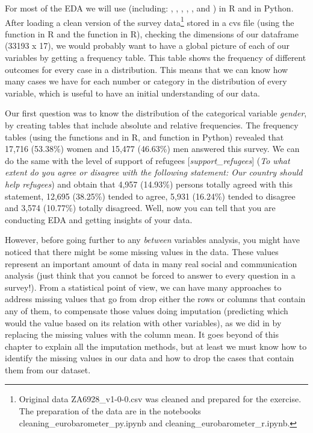 For most of the EDA we will use  (including: , , , , ,  and ) in R and  in Python. After loading a clean version of the survey data\footnote{Original data ZA6928\_v1-0-0.csv was cleaned and prepared for the exercise. The preparation of the data are in the notebooks cleaning\_eurobarometer\_py.ipynb and cleaning\_eurobarometer\_r.ipynb.}  stored in a cvs file (using the  function  in R and the  function  in R), checking the dimensions of our dataframe (33193 x 17), we would probably want to have a global picture of each of our variables by getting a frequency table. This table shows the frequency of different outcomes for every case in a distribution. This means that we can know how many cases we have for each number or category in the distribution of every variable, which is useful to have an initial understanding of our data.

		
Our first question was to know the distribution of the categorical variable \textit{gender}, by creating tables that include absolute and relative frequencies. The frequency tables (using the  functions  and  in R, and  function  in Python) revealed that 17,716 (53.38\%) women and 15,477 (46.63\%) men answered this survey. We can do the same with the level of support of refugees [\textit{support\_refugees}] (\textit{To what extent do you agree or disagree with the following statement: Our country should help refugees}) and obtain that 4,957 (14.93\%) persons totally agreed with this statement, 12,695 (38.25\%) tended to agree, 5,931 (16.24\%) tended to disagree and 3,574 (10.77\%) totally disagreed. Well, now you can tell that you are conducting EDA and getting insights of your data.


However, before going further to any \textit{between} variables analysis, you might have noticed that there might be some missing values in the data. These values represent an important amount of data in many real social and communication analysis (just think that you cannot be forced to answer to every question in a survey!). From a statistical point of view, we can have many approaches to address missing values that go from drop either the rows or columns that contain any of them, to compensate those values doing imputation (predicting which would the value based on its relation with other variables), as we did in  by replacing the missing values with the column mean. It goes beyond of this chapter to explain all the imputation methods, but at least we must know how to identify the missing values in our data and how to drop the cases that contain them from our dataset.

